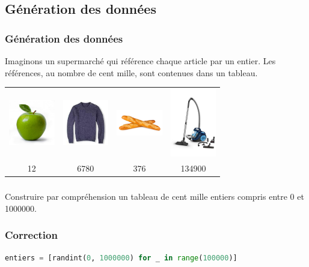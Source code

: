 \documentclass[svgnames,11pt]{beamer}
\begin{document}
\subsection{Génération des données}
\begin{frame}
    \frametitle{Génération des données}
    Imaginons un supermarché qui référence chaque article par un entier. Les références, au nombre de cent mille, sont contenues dans un tableau.

\begin{center}
    \begin{tabular}{*{4}{c}}
        \includegraphics[width=2cm]{ressources/pomme.jpg}&
        \includegraphics[width=2cm]{ressources/pull.jpg}&
        \includegraphics[width=2cm]{ressources/pain.jpg}&
        \includegraphics[width=2cm]{ressources/aspirateur.jpg}\\
        12&6780&376&134900\\
    \end{tabular}
\end{center}
\end{frame}
\begin{frame}
    \frametitle{}

    \begin{activite}
        Construire par compréhension un tableau de cent mille entiers compris entre 0 et 1000000.
    \end{activite}

\end{frame}
\begin{frame}[fragile]
    \frametitle{Correction}

    \begin{center}
    \begin{lstlisting}[language=Python , basicstyle=\small, xleftmargin=2em, xrightmargin=2em]
entiers = [randint(0, 1000000) for _ in range(100000)]
\end{lstlisting}
    \label{CODE}
    \end{center}

\end{frame}
\end{document}
